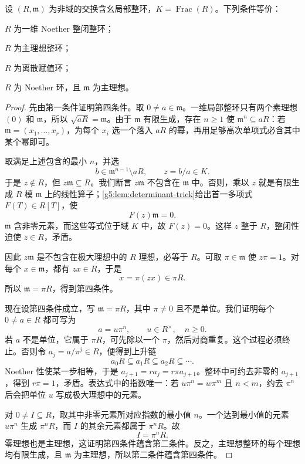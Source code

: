 \begin{theorem}
\label{g5:thm:dvr-characterizations}
	设 \((R,\mathfrak m)\) 为非域的交换含幺局部整环，\(K=\operatorname{Frac}(R)\)。下列条件等价：
	\begin{equivalences}
		\item \(R\) 为一维 Noether 整闭整环；
		\item \(R\) 为主理想整环；
		\item \(R\) 为离散赋值环；
		\item \(R\) 为 Noether 环，且 \(\mathfrak m\) 为主理想。
	\end{equivalences}
\end{theorem}
\begin{proof}
	先由第一条件证明第四条件。取 \(0\ne a\in\mathfrak m\)。一维局部整环只有两个素理想 \((0)\) 和 \(\mathfrak m\)，所以 \(\sqrt{aR}=\mathfrak m\)。由于 \(\mathfrak m\) 有限生成，存在 \(n\geq1\) 使 \(\mathfrak m^n\subseteq aR\)：若 \(\mathfrak m=(x_1,\ldots,x_r)\)，为每个 \(x_i\) 选一个落入 \(aR\) 的幂，再用足够高次单项式必含其中某个幂即可。

	取满足上述包含的最小 \(n\)，并选
	\[
		b\in\mathfrak m^{n-1}\setminus aR,\qquad z=b/a\in K.
	\]
	于是 \(z\notin R\)，但 \(z\mathfrak m\subseteq R\)。我们断言 \(z\mathfrak m\) 不包含在 \(\mathfrak m\) 中。否则，乘以 \(z\) 就是有限生成 \(R\) 模 \(\mathfrak m\) 上的线性算子；\cref{g5:lem:determinant-trick}给出首一多项式 \(F(T)\in R[T]\)，使
	\[
		F(z)\mathfrak m=0.
	\]
	\(\mathfrak m\) 含非零元素，而这些等式位于域 \(K\) 中，故 \(F(z)=0\)。这样 \(z\) 整于 \(R\)，整闭性迫使 \(z\in R\)，矛盾。

	因此 \(z\mathfrak m\) 是不包含在极大理想中的 \(R\) 理想，必等于 \(R\)。可取 \(\pi\in\mathfrak m\) 使 \(z\pi=1\)。对每个 \(x\in\mathfrak m\)，都有 \(zx\in R\)，于是
	\[
		x=\pi(zx)\in\pi R.
	\]
	所以 \(\mathfrak m=\pi R\)，得到第四条件。

	现在设第四条件成立，写 \(\mathfrak m=\pi R\)，其中 \(\pi\ne0\) 且不是单位。我们证明每个 \(0\ne a\in R\) 都可写为
	\[
		a=u\pi^n,\qquad u\in R^\times,\quad n\geq0.
	\]
	若 \(a\) 不是单位，它属于 \(\pi R\)，可先除以一个 \(\pi\)，然后对商重复。这个过程必须终止。否则令 \(a_j=a/\pi^j\in R\)，便得到上升链
	\[
		a_0R\subseteq a_1R\subseteq a_2R\subseteq\cdots.
	\]
	Noether 性使某一步相等，于是 \(a_{j+1}=ra_j=r\pi a_{j+1}\)。整环中可约去非零的 \(a_{j+1}\)，得到 \(r\pi=1\)，矛盾。表达式中的指数唯一：若 \(u\pi^n=w\pi^m\) 且 \(n<m\)，约去 \(\pi^n\) 后会把单位 \(u\) 写成极大理想中的元素。

	对 \(0\ne I\subseteq R\)，取其中非零元素所对应指数的最小值 \(n\)。一个达到最小值的元素 \(u\pi^n\) 生成 \(\pi^nR\)，而 \(I\) 的其余元素都属于 \(\pi^nR\)。故
	\[
		I=\pi^nR.
	\]
	零理想也是主理想，这证明第四条件蕴含第二条件。反之，主理想整环的每个理想均有限生成，且 \(\mathfrak m\) 为主理想，所以第二条件蕴含第四条件。


\end{proof}
